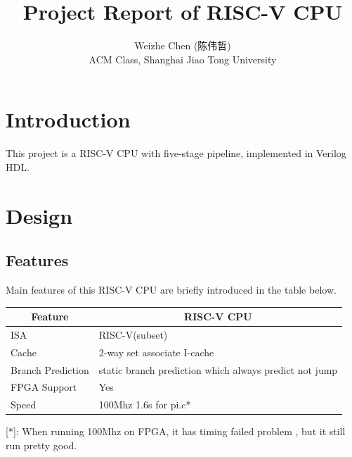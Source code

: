 \documentclass[12pt, a4paper]{article}
\title{Project Report of RISC-V CPU}
\author{Weizhe Chen (陈伟哲)\\ACM Class, Shanghai Jiao Tong University}
\date{}
\theoremstyle{margin}
\begin{document}
\maketitle

\section{Introduction}

This project is a RISC-V CPU with five-stage pipeline, implemented in Verilog HDL.

\section{Design}

\subsection{Features}

Main features of this RISC-V CPU are briefly introduced in the table below.

\begin{table}[H]
\centering
\begin{tabular}{@{}ll@{}}
\toprule
\multicolumn{1}{c}{Feature} & \multicolumn{1}{c}{RISC-V CPU}                                                                        \\ \midrule
ISA                         & RISC-V(subset) \\
Cache                       & 2-way set associate I-cache\\
Branch Prediction           & static branch prediction which always predict not jump\\
FPGA Support                & Yes\\
Speed                       & 100Mhz 1.6s for pi.c*\\
 \bottomrule
\end{tabular}
\end{table}

[*]: When running 100Mhz on FPGA, it has timing failed problem , but it still run pretty good.

\iffalse
\end{document}
